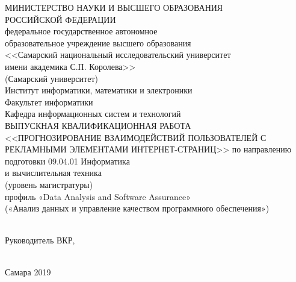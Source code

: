 \thispagestyle{empty}
\begin{center}
МИНИСТЕРСТВО НАУКИ И ВЫСШЕГО ОБРАЗОВАНИЯ \\
РОССИЙСКОЙ ФЕДЕРАЦИИ\vspace{14pt} \\
федеральное государственное автономное \\
образовательное учреждение высшего образования \\
<<Самарский национальный исследовательский университет \\
имени академика С.П. Королева>> \\
(Самарский университет)\vspace{28pt} \\
Институт информатики, математики и электроники \\
Факультет информатики \\
Кафедра информационных систем и технологий\vspace{28pt} \\
ВЫПУСКНАЯ КВАЛИФИКАЦИОННАЯ РАБОТА \\
\vfill
<<ПРОГНОЗИРОВАНИЕ ВЗАИМОДЕЙСТВИЙ ПОЛЬЗОВАТЕЛЕЙ С РЕКЛАМНЫМИ ЭЛЕМЕНТАМИ ИНТЕРНЕТ-СТРАНИЦ>>
\vfill
\onehalfspacing{}
по направлению подготовки 09.04.01 Информатика \\
и вычислительная техника \\
(уровень магистратуры) \\
профиль «Data Analysis and Software Assurance» \\
(«Анализ данных и управление качеством программного обеспечения»)\vspace{14pt}
\end{center}
\singlespacing{}
\vspace{14pt}\\
Руководитель ВКР,\\
\vspace{14pt}\\
\vfill
\begin{center}
Самара 2019
\end{center}